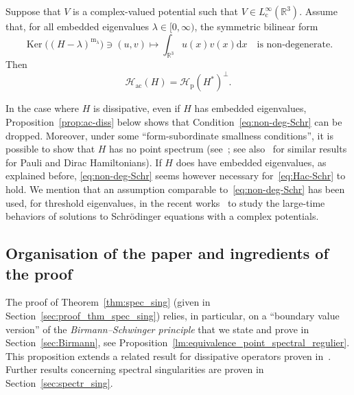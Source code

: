 \documentclass[AHL,Unicode,longabstracts,published]{cedram}
\newcommand{\Hi}{\mathcal{H}}
\newcommand{\R}{\mathbb{R}}
\newcommand{\rmp}{\mathrm{p}}
\newcommand{\acr}{\mathrm{ac}}
\newcommand{\rmc}{\mathrm{c}}
\newcommand{\rmd}{\mathrm{d}}
\newcommand{\rmm}{\mathrm{m}}
\DeclareMathOperator{\Ker}{Ker}
\newcommand{\Hi}{\mathcal{H}}
\newcommand{\rmp}{\mathrm{p}}
\newcommand{\R}{\mathbb{R}}
\newcommand{\acr}{\mathrm{ac}}
\begin{document}
\begin{prop}\label{prop:schr_H-ac}
Suppose that $V$ is a complex-valued potential such that $V \in L^\infty_{ \rmc }(\R^3)$. Assume that, for all embedded eigenvalues $\lambda\in[0,\infty)$, the symmetric bilinear form
\begin{equation}\label{eq:non-deg-Schr}
\Ker\big((H-\lambda)^{\rmm_\lambda}\big) \ni (u,v)\mapsto \int_{\R^3}u(x)v(x)\rmd x \quad\text{is non-degenerate}.
\end{equation}
Then
\begin{equation}\label{eq:Hac-Schr}
\Hi_\acr(H)=\Hi_\rmp(H^*)^\perp.
\end{equation}
\end{prop}

In the case where $H$ is dissipative, even if $H$ has embedded eigenvalues, Proposition~\ref{prop:ac-diss} below shows that Condition~\eqref{eq:non-deg-Schr} can be dropped. Moreover, under some ``form-subordinate smallness conditions'', it is possible to show that $H$ has no point spectrum (see~\cite{FaKrVe18_01}; see also~\cite{CoFaKr20_01} for similar results for Pauli and Dirac Hamiltonians). If $H$ does have embedded eigenvalues, as explained before, \eqref{eq:non-deg-Schr} seems however necessary for~\eqref{eq:Hac-Schr} to hold. We mention that an assumption comparable to~\eqref{eq:non-deg-Schr} has been used, for threshold eigenvalues, in the recent works~\cite{Aa21_01,Wa20_01} to study the large-time behaviors of solutions to Schr\"odinger equations with a complex potentials.

\subsection{Organisation of the paper and ingredients of the proof}\label{subsec:ideas}

The proof of Theorem~\ref{thm:spec_sing} (given in Section~\ref{sec:proof_thm_spec_sing}) relies, in particular, on a ``boundary value version'' of the \emph{Birmann--Schwinger principle} that we state and prove in Section~\ref{sec:Birmann}, see Proposition~\ref{lm:equivalence_point_spectral_regulier}. This proposition extends a related result for dissipative operators proven in~\cite[Lemma~4.1]{FaNi18_01}. Further results concerning spectral singularities are proven in Section~\ref{sec:spectr_sing}.
\end{document}
